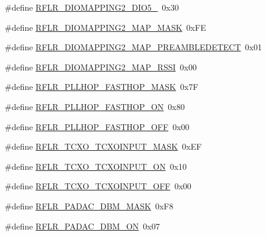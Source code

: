 \begin{DoxyCompactItemize}
\item 
\#define \mbox{\hyperlink{sx1276_regs-_lo_ra_8h_a293990dac05ba899104544d255d9e1f3}{R\+F\+L\+R\+\_\+\+D\+I\+O\+M\+A\+P\+P\+I\+N\+G2\+\_\+\+D\+I\+O5\+\_}}~0x30
\item 
\#define \mbox{\hyperlink{sx1276_regs-_lo_ra_8h_a4a8cafb2b79d52ca4f11f47fef8b9884}{R\+F\+L\+R\+\_\+\+D\+I\+O\+M\+A\+P\+P\+I\+N\+G2\+\_\+\+M\+A\+P\+\_\+\+M\+A\+SK}}~0x\+FE
\item 
\#define \mbox{\hyperlink{sx1276_regs-_lo_ra_8h_a3f69971419d7493c492a601189ba9831}{R\+F\+L\+R\+\_\+\+D\+I\+O\+M\+A\+P\+P\+I\+N\+G2\+\_\+\+M\+A\+P\+\_\+\+P\+R\+E\+A\+M\+B\+L\+E\+D\+E\+T\+E\+CT}}~0x01
\item 
\#define \mbox{\hyperlink{sx1276_regs-_lo_ra_8h_a20f17873979d88df5568f438d530d5ec}{R\+F\+L\+R\+\_\+\+D\+I\+O\+M\+A\+P\+P\+I\+N\+G2\+\_\+\+M\+A\+P\+\_\+\+R\+S\+SI}}~0x00
\item 
\#define \mbox{\hyperlink{sx1276_regs-_lo_ra_8h_ac5ab476a5c458941851fdd45d4dd863c}{R\+F\+L\+R\+\_\+\+P\+L\+L\+H\+O\+P\+\_\+\+F\+A\+S\+T\+H\+O\+P\+\_\+\+M\+A\+SK}}~0x7F
\item 
\#define \mbox{\hyperlink{sx1276_regs-_lo_ra_8h_abeb38c8feecc22921c7099f076dd6996}{R\+F\+L\+R\+\_\+\+P\+L\+L\+H\+O\+P\+\_\+\+F\+A\+S\+T\+H\+O\+P\+\_\+\+ON}}~0x80
\item 
\#define \mbox{\hyperlink{sx1276_regs-_lo_ra_8h_ac5a89ff2be0dcb49df1188731bfb6503}{R\+F\+L\+R\+\_\+\+P\+L\+L\+H\+O\+P\+\_\+\+F\+A\+S\+T\+H\+O\+P\+\_\+\+O\+FF}}~0x00
\item 
\#define \mbox{\hyperlink{sx1276_regs-_lo_ra_8h_a2c9b68a7cd24f958fce90a5e5fa48e3f}{R\+F\+L\+R\+\_\+\+T\+C\+X\+O\+\_\+\+T\+C\+X\+O\+I\+N\+P\+U\+T\+\_\+\+M\+A\+SK}}~0x\+EF
\item 
\#define \mbox{\hyperlink{sx1276_regs-_lo_ra_8h_a4af451aaa27188e884108961c0e24bbb}{R\+F\+L\+R\+\_\+\+T\+C\+X\+O\+\_\+\+T\+C\+X\+O\+I\+N\+P\+U\+T\+\_\+\+ON}}~0x10
\item 
\#define \mbox{\hyperlink{sx1276_regs-_lo_ra_8h_a248c5dfb7c8e38ef7005ba6fdcfe94ca}{R\+F\+L\+R\+\_\+\+T\+C\+X\+O\+\_\+\+T\+C\+X\+O\+I\+N\+P\+U\+T\+\_\+\+O\+FF}}~0x00
\item 
\#define \mbox{\hyperlink{sx1276_regs-_lo_ra_8h_a56956e6af4645664d25bd3cc40a3a477}{R\+F\+L\+R\+\_\+\+P\+A\+D\+A\+C\+\_\+D\+B\+M\+\_\+\+M\+A\+SK}}~0x\+F8
\item 
\#define \mbox{\hyperlink{sx1276_regs-_lo_ra_8h_a9e1e9d92a5d04b4c5ffcca9dde04cc7e}{R\+F\+L\+R\+\_\+\+P\+A\+D\+A\+C\+\_\+D\+B\+M\+\_\+\+ON}}~0x07
\item 

\end{DoxyCompactItemize}
